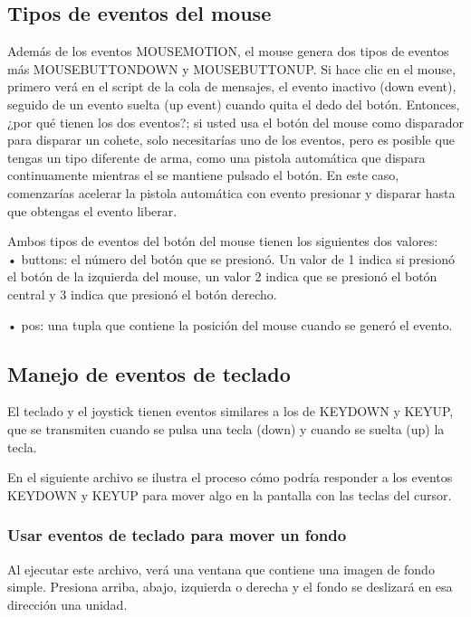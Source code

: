 \subsection{Tipos de eventos del mouse}

Además de los eventos {\ttfamily MOUSEMOTION}, el mouse genera dos tipos de eventos más {\ttfamily MOUSEBUTTONDOWN} y 
{\ttfamily MOUSEBUTTONUP}.  Si hace clic en el mouse, primero verá en el script de la cola de mensajes, el evento inactivo (down event), seguido de un evento suelta (up event) cuando quita el dedo del botón. Entonces, ¿por qué tienen los dos eventos?; si usted usa el botón del mouse como disparador para disparar un cohete, solo necesitarías uno de los eventos, pero es posible que tengas un tipo diferente de arma, como una pistola  automática  que dispara continuamente mientras el se mantiene pulsado el botón. En este caso, comenzarías acelerar la pistola  automática con evento  presionar y disparar hasta que obtengas el evento liberar.

Ambos tipos de eventos del botón del mouse  tienen los  siguientes  dos valores:\\

• buttons: el número del botón que se presionó. Un valor de 1 indica si presionó el botón de la izquierda  del mouse, un valor 2 indica que se presionó el botón central y 3 indica que presionó el botón derecho.

• pos: una tupla que contiene la posición del mouse cuando se generó el evento.

\subsection{Manejo de eventos de teclado}

El teclado y el joystick tienen eventos similares a los de {\ttfamily KEYDOWN} y  {\ttfamily KEYUP}, que se transmiten 
cuando se pulsa una tecla  (down) y  cuando se suelta (up) la tecla. 

En el siguiente archivo se ilustra el proceso cómo podría responder a los eventos {\ttfamily KEYDOWN} y  {\ttfamily KEYUP}  para mover algo en la pantalla con las teclas del cursor. 

\subsubsection{Usar eventos de teclado para mover un fondo}

Al ejecutar este archivo, verá una ventana que contiene una imagen de fondo simple. Presiona arriba, abajo,
izquierda o derecha y el fondo se deslizará en esa dirección una unidad. 

